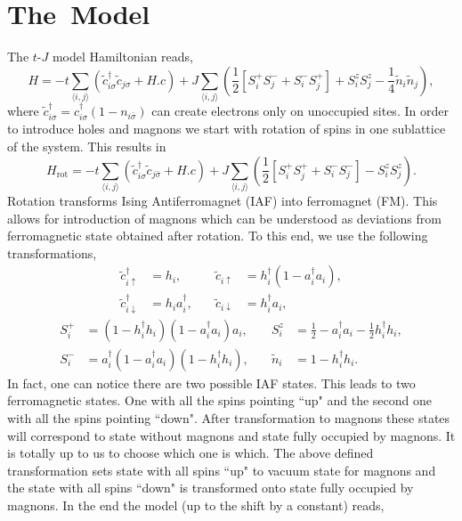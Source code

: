 \documentclass[12pt, a4paper]{article}
\newcommand{\mean}[1]{\langle#1\rangle}
\begin{document}
\section{The~Model}
The $t$-$J$ model Hamiltonian reads,
\begin{equation}
	H = -t\sum_{\mean{i,j}}\left(\tilde{c}_{i\sigma}^\dagger\tilde{c}_{j\sigma} + H.c\right)
	+ J\sum_{\mean{i,j}}\left(\frac{1}{2}\left[S_i^+S_j^- + S_i^-S_j^+\right] + S_i^zS_j^z - \frac{1}{4}\tilde{n}_i\tilde{n}_j\right),
\end{equation}
where $\tilde{c}_{i\sigma}^\dagger = c_{i\sigma}^\dagger(1-n_{i\bar{\sigma}})$ can create electrons only on unoccupied sites. In order to introduce holes and magnons we start with rotation of spins in one sublattice of the system. This results in
\begin{equation}
	H_{\text{rot}} = -t\sum_{\mean{i,j}}\left(\tilde{c}_{i\sigma}^\dagger\tilde{c}_{j\bar{\sigma}} + H.c\right)
	+ J\sum_{\mean{i,j}}\left(\frac{1}{2}\left[S_i^+S_j^+ + S_i^-S_j^-\right] - S_i^zS_j^z\right).
\end{equation}
Rotation transforms Ising Antiferromagnet (IAF) into ferromagnet (FM). This allows for introduction of magnons which can be understood as deviations from ferromagnetic state obtained after rotation. To this end, we use the following transformations,
\begin{equation}
	\begin{aligned}
	\tilde{c}_{i\uparrow}^\dag &= h_i, &\quad \tilde{c}_{i\uparrow} &= h_i^\dag (1 - a_i^\dag a_i), \\
	\tilde{c}_{i\downarrow}^\dag &= h_i a_i^\dag, &\quad \tilde{c}_{i\downarrow} &= h_i^\dag a_i,
	\end{aligned}
\end{equation}
\begin{equation}
	\begin{aligned}
		S_i^+ &= (1 - h_i^\dag h_i)(1 - a_i^\dag a_i)a_i, &\quad S_i^z &= \frac{1}{2} - a_i^\dag a_i - \frac{1}{2}h_i^\dag h_i, \\
		S_i^- &= a_i^\dag (1 - a_i^\dag a_i)(1 - h_i^\dag h_i), &\quad \tilde{n}_i &= 1 - h_i^\dag h_i.
	\end{aligned}
\end{equation}
In fact, one can notice there are two possible IAF states. This leads to two ferromagnetic states. One with all the spins pointing ``up" and the second one with all the spins pointing ``down". After transformation to magnons these states will correspond to state without magnons and state fully occupied by magnons. It is totally up to us to choose which one is which. The above defined transformation sets state with all spins ``up" to vacuum state for magnons and the state with all spins ``down" is transformed onto state fully occupied by magnons. In the end the model (up to the shift by a constant) reads,
\end{document}
